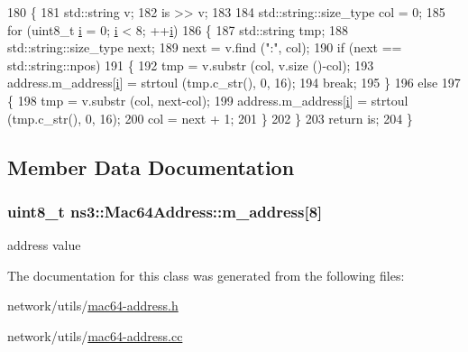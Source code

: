 \begin{DoxyCode}
180 \{
181   std::string v;
182   is >> v;
183 
184   std::string::size\_type col = 0;
185   \textcolor{keywordflow}{for} (uint8\_t \hyperlink{bernuolliDistribution_8m_a6f6ccfcf58b31cb6412107d9d5281426}{i} = 0; \hyperlink{bernuolliDistribution_8m_a6f6ccfcf58b31cb6412107d9d5281426}{i} < 8; ++\hyperlink{bernuolliDistribution_8m_a6f6ccfcf58b31cb6412107d9d5281426}{i})
186     \{
187       std::string tmp;
188       std::string::size\_type next;
189       next = v.find (\textcolor{stringliteral}{":"}, col);
190       \textcolor{keywordflow}{if} (next == std::string::npos)
191         \{
192           tmp = v.substr (col, v.size ()-col);
193           address.m\_address[\hyperlink{bernuolliDistribution_8m_a6f6ccfcf58b31cb6412107d9d5281426}{i}] = strtoul (tmp.c\_str(), 0, 16);
194           \textcolor{keywordflow}{break};
195         \}
196       \textcolor{keywordflow}{else}
197         \{
198           tmp = v.substr (col, next-col);
199           address.m\_address[\hyperlink{bernuolliDistribution_8m_a6f6ccfcf58b31cb6412107d9d5281426}{i}] = strtoul (tmp.c\_str(), 0, 16);
200           col = next + 1;
201         \}
202     \}
203   \textcolor{keywordflow}{return} is;
204 \}
\end{DoxyCode}


\subsection{Member Data Documentation}
\subsubsection[{\texorpdfstring{m\+\_\+address}{m_address}}]{\setlength{\rightskip}{0pt plus 5cm}uint8\+\_\+t ns3\+::\+Mac64\+Address\+::m\+\_\+address\mbox{[}8\mbox{]}\hspace{0.3cm}{\ttfamily [private]}}\hypertarget{classns3_1_1Mac64Address_a0bb9eb08237d6b2aedb767cdec7ce590}{}\label{classns3_1_1Mac64Address_a0bb9eb08237d6b2aedb767cdec7ce590}


address value 



The documentation for this class was generated from the following files\+:\begin{DoxyCompactItemize}
\item 
network/utils/\hyperlink{mac64-address_8h}{mac64-\/address.\+h}\item 
network/utils/\hyperlink{mac64-address_8cc}{mac64-\/address.\+cc}\end{DoxyCompactItemize}
